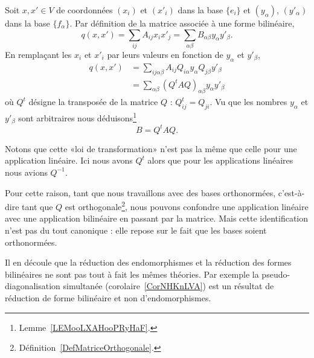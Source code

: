 Soit \( x,x'\in V\) de coordonnées \( (x_i)\) et \( (x'_i)\) dans la base \( \{ e_i \}\) et \( (y_{\alpha})\), \( (y'_{\alpha})\) dans la base \( \{ f_{\alpha} \}\). Par définition de la matrice associée à une forme bilinéaire,
\begin{equation}
    q(x,x')=\sum_{ij}A_{ij}x_ix'_j=\sum_{\alpha\beta}B_{\alpha\beta}y_{\alpha}y'_{\beta}.
\end{equation}
En remplaçant les \( x_i\) et \( x'_i\) par leurs valeurs en fonction de \( y_{\alpha}\) et \( y'_{\beta}\),
\begin{subequations}
    \begin{align}
        q(x,x')&=\sum_{ij\alpha\beta}A_{ij}Q_{i\alpha}y_{\alpha}Q_{j\beta}y'_{\beta}\\
        &=\sum_{\alpha\beta}(Q^tAQ)_{\alpha\beta}y_{\alpha}y'_{\beta}
    \end{align}
\end{subequations}
où \( Q^t\) désigne la transposée de la matrice \( Q\) :  \( Q^t_{ij}=Q_{ji}\). Vu que les nombres \( y_{\alpha}\) et \( y'_{\beta}\) sont arbitraires nous déduisons\footnote{Lemme~\ref{LEMooLXAHooPRyHaF}.}
\begin{equation}        \label{EQooZUVTooKjqnJj}
    B=Q^tAQ.
\end{equation}

\begin{remark}
    Notons que cette «loi de transformation» n'est pas la même que celle pour une application linéaire. Ici nous avons \( Q^t\) alors que pour les applications linéaires nous avions \( Q^{-1}\).

    Pour cette raison, tant que nous travaillons avec des bases orthonormées, c'est-à-dire tant que \( Q\) est orthogonale\footnote{Définition~\ref{DefMatriceOrthogonale}.}, nous pouvons confondre une application linéaire avec une application bilinéaire en passant par la matrice. Mais cette identification n'est pas du tout canonique : elle repose sur le fait que les bases soient orthonormées.

    Il en découle que la réduction des endomorphismes et la réduction des formes bilinéaires ne sont pas tout à fait les mêmes théories. Par exemple la pseudo-diagonalisation simultanée (corolaire~\ref{CorNHKnLVA}) est un résultat de réduction de forme bilinéaire et non d'endomorphismes.
\end{remark}

